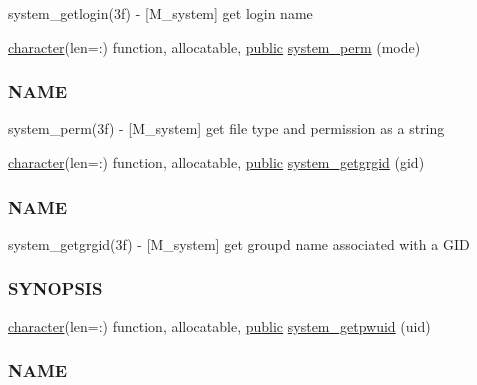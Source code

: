 \begin{DoxyCompactItemize}
\begin{DoxyCompactList}
system\+\_\+getlogin(3f) -\/ \mbox{[}M\+\_\+system\mbox{]} get login name \end{DoxyCompactList}\item 
\hyperlink{option__stopwatch_83_8txt_abd4b21fbbd175834027b5224bfe97e66}{character}(len=\+:) function, allocatable, \hyperlink{M__stopwatch_83_8txt_a2f74811300c361e53b430611a7d1769f}{public} \hyperlink{namespacem__system_ae8f39e1d4e420396319105e4e81f92b5}{system\+\_\+perm} (mode)
\begin{DoxyCompactList}\small\item\em \subsubsection*{N\+A\+ME}

system\+\_\+perm(3f) -\/ \mbox{[}M\+\_\+system\mbox{]} get file type and permission as a string \end{DoxyCompactList}\item 
\hyperlink{option__stopwatch_83_8txt_abd4b21fbbd175834027b5224bfe97e66}{character}(len=\+:) function, allocatable, \hyperlink{M__stopwatch_83_8txt_a2f74811300c361e53b430611a7d1769f}{public} \hyperlink{namespacem__system_aec137429fbb8c848db4ecd914466d7e8}{system\+\_\+getgrgid} (gid)
\begin{DoxyCompactList}\small\item\em \subsubsection*{N\+A\+ME}

system\+\_\+getgrgid(3f) -\/ \mbox{[}M\+\_\+system\mbox{]} get groupd name associated with a G\+ID \subsubsection*{S\+Y\+N\+O\+P\+S\+IS}\end{DoxyCompactList}\item 
\hyperlink{option__stopwatch_83_8txt_abd4b21fbbd175834027b5224bfe97e66}{character}(len=\+:) function, allocatable, \hyperlink{M__stopwatch_83_8txt_a2f74811300c361e53b430611a7d1769f}{public} \hyperlink{namespacem__system_a59cd13de95dc9a65b444f02614ea39ce}{system\+\_\+getpwuid} (uid)
\begin{DoxyCompactList}\small\item\em \subsubsection*{N\+A\+ME}


\end{DoxyCompactList}
\end{DoxyCompactItemize}
